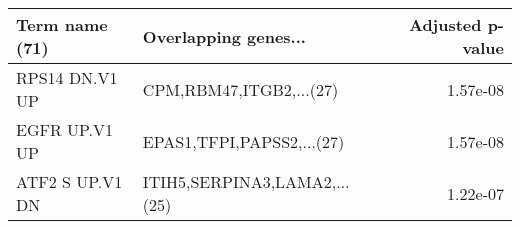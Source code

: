\begin{tabular}{llr}
\toprule
 Term name (71) &         Overlapping genes... &  Adjusted p-value \\
\midrule
 RPS14 DN.V1 UP &      CPM,RBM47,ITGB2,...(27) &          1.57e-08 \\
  EGFR UP.V1 UP &    EPAS1,TFPI,PAPSS2,...(27) &          1.57e-08 \\
ATF2 S UP.V1 DN & ITIH5,SERPINA3,LAMA2,...(25) &          1.22e-07 \\
\bottomrule
\end{tabular}
